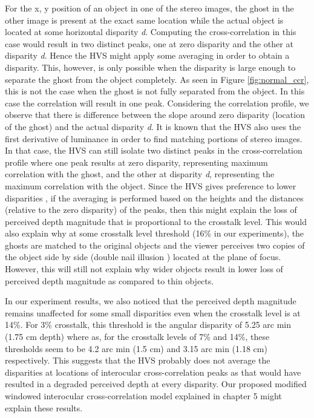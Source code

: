 For the x, y position of an object in one of the stereo images, the ghost in the other image is present at the exact same location while the actual object is located at some horizontal disparity \emph{d}. Computing the cross-correlation in this case would result in two distinct peaks, one at zero disparity and the other at disparity \emph{d}. Hence the HVS might apply some averaging in order to obtain a disparity. This, however, is only possible when the disparity is large enough to separate the ghost from the object completely. As seen in Figure \ref{fig:normal_ccr}, this is not the case when the ghost is not fully separated from the object. In this case the correlation will result in one peak. Considering the correlation profile, we observe that there is difference between the slope around zero disparity (location of the ghost) and the actual disparity \emph{d}. It is known \cite{howard1995binocular} that the HVS also uses the first derivative of luminance in order to find matching portions of stereo images. In that case, the HVS can still isolate two distinct peaks in the cross-correlation profile where one peak results at zero disparity, representing maximum correlation with the ghost, and the other at disparity \emph{d}, representing the maximum correlation with the object. Since the HVS gives preference to lower disparities \cite{krol1980double}, if the averaging is performed based on the heights and the distances (relative to the zero disparity) of the peaks, then this might explain the loss of perceived depth magnitude that is proportional to the crosstalk level. This would also explain why at some crosstalk level threshold (16\% in our experiments), the ghosts are matched to the original objects and the viewer perceives two copies of the object side by side (double nail illusion \cite{tsirlin2012effect}) located at the plane of focus. However, this will still not explain why wider objects result in lower loss of perceived depth magnitude as compared to thin objects.

In our experiment results, we also noticed that the perceived depth magnitude remains unaffected for some small disparities even when the crosstalk level is at 14\%. For 3\% crosstalk, this threshold is the angular disparity of 5.25 arc min (1.75 cm depth) where as, for the crosstalk levels of 7\% and 14\%, these thresholds seem to be 4.2 arc min (1.5 cm) and 3.15 arc min (1.18 cm) respectively. This suggests that the HVS probably does not average the disparities at locations of interocular cross-correlation peaks as that would have resulted in a degraded perceived depth at every disparity. Our proposed modified windowed interocular cross-correlation model explained in chapter 5 might explain these results.

